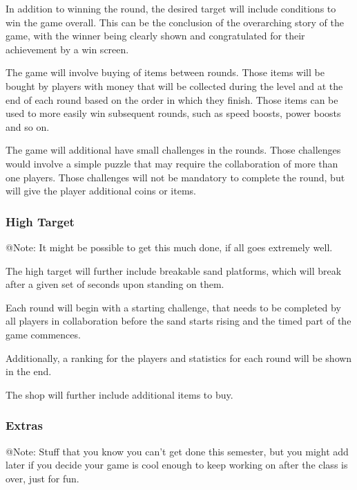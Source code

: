 In addition to winning the round, the desired target will include conditions to win the game overall. This can be the conclusion of the overarching story of the game, with the winner being clearly shown and congratulated for their achievement by a win screen.

The game will involve buying of items between rounds. Those items will be bought by players with money that will be collected during the level and at the end of each round based on the order in which they finish. Those items can be used to more easily win subsequent rounds, such as speed boosts, power boosts and so on.

The game will additional have small challenges in the rounds. Those challenges would involve a simple puzzle that may require the collaboration of more than one players. Those challenges will not be mandatory to complete the round, but will give the player additional coins or items.

\subsubsection{High Target}

\begin{TempText}
	@Note: It might be possible to get this much done, if all goes extremely well.
\end{TempText}

The high target will further include breakable sand platforms, which will break after a given set of seconds upon standing on them.

Each round will begin with a starting challenge, that needs to be completed by all players in collaboration before the sand starts rising and the timed part of the game commences.

Additionally, a ranking for the players and statistics for each round will be shown in the end.

The shop will further include additional items to buy.

\subsubsection{Extras}

\begin{TempText}
	@Note: Stuff that you know you can't get done this semester, but you might add later if you decide your game is cool enough to keep working on after the class is over, just for fun.
\end{TempText}

